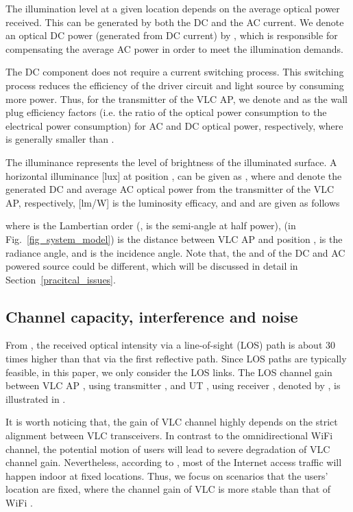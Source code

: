 \documentclass[10pt,journal]{IEEEtran}
\begin{document}
The illumination level at a given location depends on the average optical power received. This can be generated by both the DC and the AC current. We denote an optical DC power (generated from DC current) by , which is responsible for compensating the average AC power in order to meet the illumination demands.

The DC component does not require a current switching process. This switching process reduces the efficiency of the driver circuit and light source by consuming more power. Thus, for the transmitter  of the  VLC AP, we denote  and  as the wall plug efficiency factors (i.e. the ratio of the optical power consumption to the electrical power consumption) for AC and DC optical power, respectively, where  is generally smaller than .

The illuminance represents the level of brightness of the illuminated surface. A horizontal illuminance  [lux] at position , can be given \cite{din2014energy} as , where  and  denote the generated DC and average AC optical power from the transmitter  of the  VLC AP, respectively,  [lm/W] is the luminosity efficacy, and  and  are given as follows

where  is the Lambertian order (,  is the semi-angle at half power), (in Fig.~\ref{fig_system_model})  is the distance between VLC AP  and position ,  is the radiance angle, and  is the incidence angle. Note that, the  and  of the DC and AC powered source could be different, which will be discussed in detail in Section~\ref{pracitcal_issues}.

\subsection{Channel capacity, interference and noise}
From \cite{komine2004fundamental}, the received optical intensity via a line-of-sight (LOS) path is about 30 times higher than that via the first reflective path. Since LOS paths are typically feasible, in this paper, we only consider the LOS links. The LOS channel gain between VLC AP , using transmitter , and UT , using receiver , denoted by , is illustrated in \cite{komine2004fundamental}.

It is worth noticing that, the gain of VLC channel highly depends on the strict alignment between VLC transceivers. In contrast to the omnidirectional WiFi channel, the potential motion of users will lead to severe degradation of VLC channel gain. Nevertheless, according to \cite{Cisco2015service}, most of the Internet access traffic will happen indoor at fixed locations. Thus, we focus on scenarios that the users' location are fixed, where the channel gain of VLC is more stable than that of WiFi \cite{zhang2015dancing}.
\end{document}
